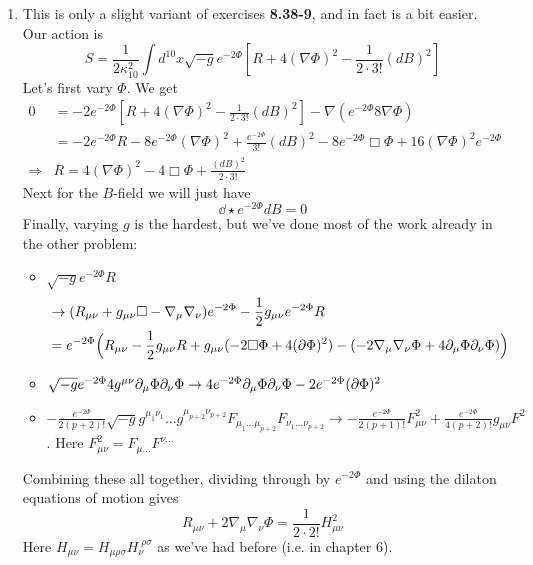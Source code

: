 \documentclass[11pt, class=article, crop=false]{standalone}
\begin{document}
\begin{enumerate}
	\item This is only a slight variant of exercises \textbf{8.38-9}, and in fact is a bit easier. Our action is
	\[
		S = \frac{1}{2 \kappa_{10}^2} \int d^{10} x \sqrt{-g} e^{-2\Phi} \left[R + 4 (\nabla \Phi)^2 - \frac{1}{2 \cdot 3!} (dB)^2 \right]
	\]
	Let's first vary $\Phi$. We get
	\[
	\begin{aligned}
		0 &= - 2 e^{-2 \Phi}  \left[R + 4 (\nabla \Phi)^2 - \frac{1}{2 \cdot 3!} (dB)^2 \right] - \nabla(e^{-2\Phi} 8 \nabla \Phi)\\
		&= -2 e^{-2 \Phi} R - 8 e^{-2 \Phi} (\nabla \Phi)^2 + \frac{e^{-2 \Phi}}{3!} (dB)^2 - 8 e^{-2\Phi} \Box \Phi + 16 (\nabla \Phi)^2 e^{-2\Phi}\\
		\Rightarrow & R = 4 (\nabla \Phi)^2 - 4 \Box \Phi + \frac{(dB)^2}{2 \cdot 3!}
	\end{aligned}
	\]
	Next for the $B$-field we will just have
	\[
		\dd \star e^{-2\Phi} dB = 0 
	\]
	Finally, varying $g$ is the hardest, but we've done most of the work already in the other problem:
	\begin{itemize}
		\item $\sqrt{-g} e^{-2\Phi} R$
		 \[
		 \begin{aligned}
		 &\to (R_{\mu \nu} + g_{\mu \nu} \Box - \nabla_\mu \nabla_\nu) e^{-2\Phi}  - \frac12 g_{\mu \nu} e^{-2\Phi} R\\
		 &= e^{-2\Phi} \Big(R_{\mu \nu} - \frac12 g_{\mu \nu} R + g_{\mu \nu} (-2 \Box \Phi + 4 (\partial \Phi)^2) - (-2 \nabla_\mu \nabla_\nu \Phi + 4 \partial_\mu \Phi \partial_\nu \Phi) \Big) 
		 \end{aligned}
		\]
		\item $\sqrt{-g} e^{-2\Phi} 4 g^{\mu \nu} \partial_\mu \Phi \partial_\nu \Phi \to 4 e^{-2\Phi} \partial_\mu \Phi \partial_\nu \Phi - 2 e^{- 2 \Phi} (\partial \Phi)^2$
		\item $- \frac{e^{-2 \Phi}}{2(p+2)!} \sqrt{-g} g^{\mu_1 \nu_1} \dots g^{\mu_{p+2} \nu_{p+2}} F_{\mu_1 \dots \mu_{p+2}} F_{\nu_1 \dots \nu_{p+2}} \to - \frac{e^{-2 \Phi}}{2 (p+1)!} F_{\mu \nu}^2 + \frac{e^{-2 \Phi}}{4(p+2)!} g_{\mu \nu} F^2$. Here $F_{\mu \nu}^2 = F_{\mu \dots} F^{\nu \dots}$
	\end{itemize}
	Combining these all together, dividing through by $e^{-2\Phi}$ and using the dilaton equations of motion gives
	\[
		R_{\mu \nu} + 2 \nabla_\mu \nabla_\nu \Phi = \frac{1}{2 \cdot 2!} H_{\mu \nu}^2
	\]
	Here $H_{\mu \nu} = H_{\mu \rho \sigma} H_{\nu}^{\; \rho \sigma}$ as we've had before (i.e. in chapter 6). 
	

\end{enumerate}
\end{document}
